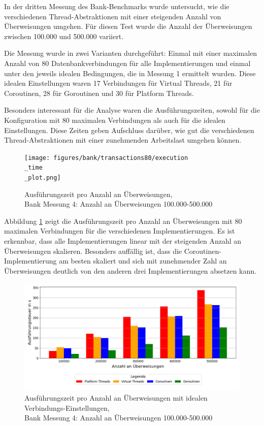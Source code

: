 \documentclass[fontsize=12pt,paper=a4,twoside=semi,parskip=half-,headsepline,headinclude]{scrreprt}
\begin{document}
In der dritten Messung des Bank-Benchmarks wurde untersucht, wie die verschiedenen Thread-Abstraktionen mit einer steigenden Anzahl von Überweisungen umgehen. Für diesen Test wurde die Anzahl der Überweisungen zwischen 100.000 und 500.000 variiert.

Die Messung wurde in zwei Varianten durchgeführt: Einmal mit einer maximalen Anzahl von 80 Datenbankverbindungen für alle Implementierungen und einmal unter den jeweils idealen Bedingungen, die in Messung 1 ermittelt wurden. Diese idealen Einstellungen waren 17 Verbindungen für Virtual Threads, 21 für Coroutinen, 28 für Goroutinen und 30 für Platform Threads.

Besonders interessant für die Analyse waren die Ausführungszeiten, sowohl für die Konfiguration mit 80 maximalen Verbindungen als auch für die idealen Einstellungen. Diese Zeiten geben Aufschluss darüber, wie gut die verschiedenen Thread-Abstraktionen mit einer zunehmenden Arbeitslast umgehen können.

\begin{figure}[H]
	\centering
	\texttt{[image: figures/bank/transactions80/execution\\\_time\\\_plot.png]}
	\caption{Ausführungszeit pro Anzahl an Überweisungen,\\ Bank Messung 4: Anzahl an Überweisungen 100.000-500.000}
	\label{fig:bankTransactions80Zeit}
\end{figure}

Abbildung \ref{fig:bankTransactions80Zeit} zeigt die Ausführungszeit pro Anzahl an Überweisungen mit 80 maximalen Verbindungen für die verschiedenen Implementierungen. Es ist erkennbar, dass alle Implementierungen linear mit der steigenden Anzahl an Überweisungen skalieren. Besonders auffällig ist, dass die Coroutinen-Implementierung am besten skaliert und sich mit zunehmender Zahl an Überweisungen deutlich von den anderen drei Implementierungen absetzen kann.

\begin{figure}[H]
	\centering
	\includegraphics[scale=0.5]{figures/bank/transactionsIdeal/execution_time_plot.png}
	\caption{Ausführungszeit pro Anzahl an Überweisungen mit idealen Verbindungs-Einstellungen,\\ Bank Messung 4: Anzahl an Überweisungen 100.000-500.000}
	\label{fig:bankTransactionsIdealZeit}
\end{figure}
\end{document}
